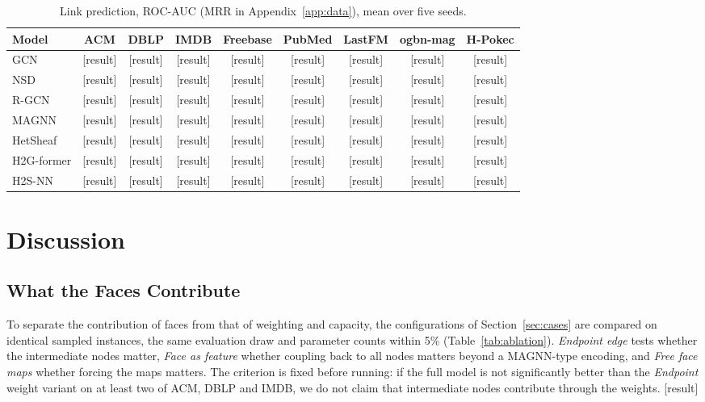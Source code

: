 \documentclass{article}
\newcommand{\method}{\textsc{H2S-NN}}
\newcommand{\res}{{\scriptsize[result]}}
\begin{document}
\begin{table}[t]
  \centering
  \caption{Link prediction, ROC-AUC (MRR in Appendix~\ref{app:data}), mean over five seeds.}
  \label{tab:link-pred}
  \footnotesize
  \setlength{\tabcolsep}{4pt}
  \begin{tabular}{lcccccccc}
    \toprule
    \textbf{Model} & ACM & DBLP & IMDB & Freebase & PubMed & LastFM & ogbn-mag & H-Pokec \\
    \midrule
    GCN & \res & \res & \res & \res & \res & \res & \res & \res \\
    NSD & \res & \res & \res & \res & \res & \res & \res & \res \\
    R-GCN & \res & \res & \res & \res & \res & \res & \res & \res \\
    MAGNN & \res & \res & \res & \res & \res & \res & \res & \res \\
    HetSheaf & \res & \res & \res & \res & \res & \res & \res & \res \\
    H2G-former & \res & \res & \res & \res & \res & \res & \res & \res \\
    \midrule
    \method{} & \res & \res & \res & \res & \res & \res & \res & \res \\
    \bottomrule
  \end{tabular}
\end{table}

\section{Discussion}
\label{sec:discussion}

\subsection{What the Faces Contribute}
To separate the contribution of faces from that of weighting and capacity, the configurations of Section~\ref{sec:cases} are compared on identical sampled instances, the same evaluation draw and parameter counts within 5\% (Table~\ref{tab:ablation}). \emph{Endpoint edge} tests whether the intermediate nodes matter, \emph{Face as feature} whether coupling back to all nodes matters beyond a MAGNN-type encoding, and \emph{Free face maps} whether forcing the maps matters. The criterion is fixed before running: if the full model is not significantly better than the \emph{Endpoint} weight variant on at least two of ACM, DBLP and IMDB, we do not claim that intermediate nodes contribute through the weights. \res{}
\end{document}
